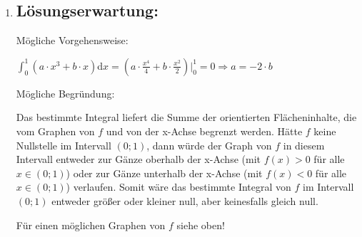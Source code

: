 \begin{langesbeispiel}
{\begin{enumerate}
Damit hat diese Gleichung zwei verschiedene reelle Lösungen und die Funktion $f$ hat insgesamt drei verschiedene Nullstellen.\leer

Mögliche Begründung:

Der Wert der Steigung der Tangente an den Graphen von $f$ an einer Stelle $x$ entspricht dem Wert $f'(x)$.

$f'(x)=3\cdot a\cdot x^2+b \Rightarrow f'(0)=b$

	\item \subsection{Lösungserwartung:} 
	
	Mögliche Vorgehensweise:
	
	$\displaystyle\int^1_0(a\cdot x^3+b\cdot x)$d$x=\left(a\cdot\frac{x^4}{4}+b\cdot\frac{x^2}{2}\right)\big|^1_0=0 \Rightarrow a=-2\cdot b$\leer
	
	Mögliche Begründung:
	
	Das bestimmte Integral liefert die Summe der orientierten Flächeninhalte, die vom Graphen von $f$ und von der x-Achse begrenzt werden. Hätte $f$ keine Nullstelle im Intervall $(0;1)$, dann würde der Graph von $f$ in diesem Intervall entweder zur Gänze oberhalb der x-Achse (mit $f(x)>0$ für alle $x\in(0;1)$) oder zur Gänze unterhalb der x-Achse (mit $f(x)<0$ für alle $x\in(0;1)$) verlaufen. Somit wäre das bestimmte Integral von $f$ im Intervall $(0;1)$ entweder größer oder kleiner null, aber keinesfalls gleich null.
	
	Für einen möglichen Graphen von $f$ siehe oben!
\end{enumerate}}
	
	\end{langesbeispiel}